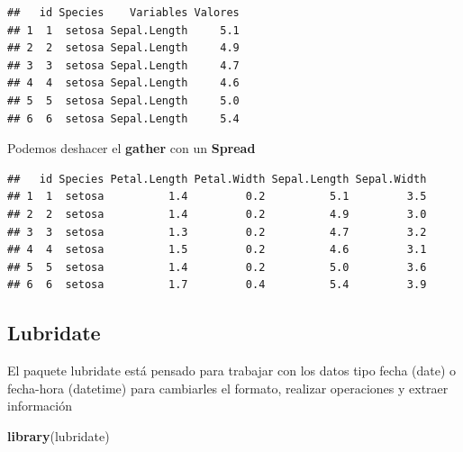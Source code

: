 \documentclass[]{book}
\newenvironment{Shaded}{\begin{snugshade}}{\end{snugshade}}
\newcommand{\CommentTok}[1]{\textcolor[rgb]{0.56,0.35,0.01}{\textit{#1}}}
\newcommand{\DataTypeTok}[1]{\textcolor[rgb]{0.13,0.29,0.53}{#1}}
\newcommand{\KeywordTok}[1]{\textcolor[rgb]{0.13,0.29,0.53}{\textbf{#1}}}
\newcommand{\NormalTok}[1]{#1}
\newcommand{\OperatorTok}[1]{\textcolor[rgb]{0.81,0.36,0.00}{\textbf{#1}}}
\newcommand{\StringTok}[1]{\textcolor[rgb]{0.31,0.60,0.02}{#1}}
\begin{document}
\begin{verbatim}
##   id Species    Variables Valores
## 1  1  setosa Sepal.Length     5.1
## 2  2  setosa Sepal.Length     4.9
## 3  3  setosa Sepal.Length     4.7
## 4  4  setosa Sepal.Length     4.6
## 5  5  setosa Sepal.Length     5.0
## 6  6  setosa Sepal.Length     5.4
\end{verbatim}

Podemos deshacer el \textbf{gather} con un \textbf{Spread}

\begin{Shaded}
\end{Shaded}

\begin{verbatim}
##   id Species Petal.Length Petal.Width Sepal.Length Sepal.Width
## 1  1  setosa          1.4         0.2          5.1         3.5
## 2  2  setosa          1.4         0.2          4.9         3.0
## 3  3  setosa          1.3         0.2          4.7         3.2
## 4  4  setosa          1.5         0.2          4.6         3.1
## 5  5  setosa          1.4         0.2          5.0         3.6
## 6  6  setosa          1.7         0.4          5.4         3.9
\end{verbatim}

\hypertarget{lubridate}{%
\subsection{Lubridate}\label{lubridate}}

El paquete lubridate está pensado para trabajar con los datos tipo fecha (date) o fecha-hora (datetime) para cambiarles el formato, realizar operaciones y extraer información

\begin{Shaded}
\begin{Highlighting}[]
\KeywordTok{library}\NormalTok{(lubridate)}
\end{Highlighting}
\end{Shaded}
\end{document}
